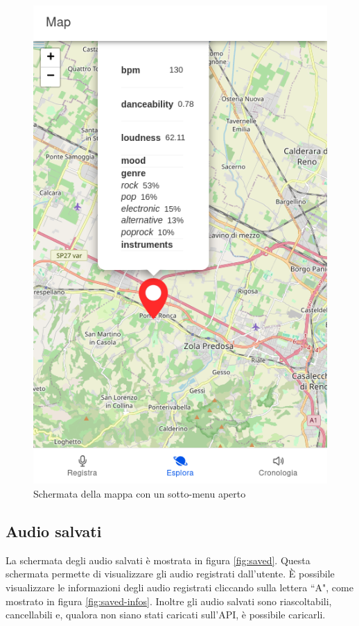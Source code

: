 \documentclass{article}
\begin{document}
\begin{figure}[H]
\begin{minipage}{0.30\textwidth}
        \includegraphics[width=\linewidth]{map-audio-submenu.png}
        \centering
        \caption{Schermata della mappa con un sotto-menu aperto}
        \label{fig:map-audio-submenu}
    \end{minipage}
\end{figure}

\subsection{Audio salvati}
La schermata degli audio salvati è mostrata in figura \ref{fig:saved}. Questa schermata permette di visualizzare gli audio registrati dall'utente. È possibile visualizzare le informazioni degli audio registrati cliccando sulla lettera ``A", come mostrato in figura \ref{fig:saved-infos}. Inoltre gli audio salvati sono riascoltabili, cancellabili e, qualora non siano stati caricati sull'API, è possibile caricarli.
\end{document}
